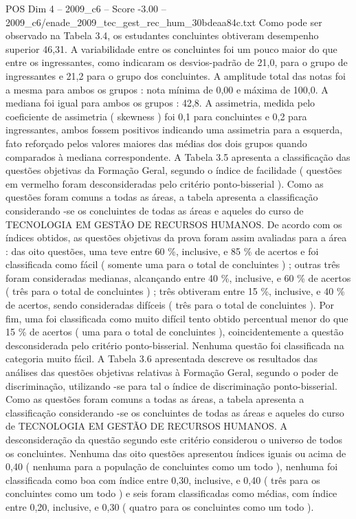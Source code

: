 \begin{textsample}{POS Dim 4 – 2009\_c6 – Score -3.00 – 2009\_c6/enade\_2009\_tec\_gest\_rec\_hum\_30bdeaa84c.txt}
Como pode ser observado na Tabela 3.4, os estudantes concluintes obtiveram desempenho superior 46,31.
A variabilidade entre os concluintes foi um pouco maior do que entre os ingressantes, como indicaram os desvios-padrão de 21,0, para o grupo de ingressantes e 21,2 para o grupo dos concluintes.
A amplitude total das notas foi a mesma para ambos os grupos : nota mínima de 0,00 e máxima de 100,0.
A mediana foi igual para ambos os grupos : 42,8.
A assimetria, medida pelo coeficiente de assimetria ( skewness ) foi 0,1 para concluintes e 0,2 para ingressantes, ambos fossem positivos indicando uma assimetria para a esquerda, fato reforçado pelos valores maiores das médias dos dois grupos quando comparados à mediana correspondente.
A Tabela 3.5 apresenta a classificação das questões objetivas da Formação Geral, segundo o índice de facilidade ( questões em vermelho foram desconsideradas pelo critério ponto-bisserial ).
Como as questões foram comuns a todas as áreas, a tabela apresenta a classificação considerando -se os concluintes de todas as áreas e aqueles do curso de TECNOLOGIA EM GESTÃO DE RECURSOS HUMANOS.
De acordo com os índices obtidos, as questões objetivas da prova foram assim avaliadas para a área : das oito questões, uma teve entre 60 \%, inclusive, e 85 \% de acertos e foi classificada como fácil ( somente uma para o total de concluintes ) ; outras três foram consideradas medianas, alcançando entre 40 \%, inclusive, e 60 \% de acertos ( três para o total de concluintes ) ; três obtiveram entre 15 \%, inclusive, e 40 \% de acertos, sendo consideradas difíceis ( três para o total de concluintes ).
Por fim, uma foi classificada como muito difícil tento obtido percentual menor do que 15 \% de acertos ( uma para o total de concluintes ), coincidentemente a questão desconsiderada pelo critério ponto-bisserial.
Nenhuma questão foi classificada na categoria muito fácil.
A Tabela 3.6 apresentada descreve os resultados das análises das questões objetivas relativas à Formação Geral, segundo o poder de discriminação, utilizando -se para tal o índice de discriminação ponto-bisserial.
Como as questões foram comuns a todas as áreas, a tabela apresenta a classificação considerando -se os concluintes de todas as áreas e aqueles do curso de TECNOLOGIA EM GESTÃO DE RECURSOS HUMANOS.
A desconsideração da questão segundo este critério considerou o universo de todos os concluintes.
Nenhuma das oito questões apresentou índices iguais ou acima de 0,40 ( nenhuma para a população de concluintes como um todo ), nenhuma foi classificada como boa com índice entre 0,30, inclusive, e 0,40 ( três para os concluintes como um todo ) e seis foram classificadas como médias, com índice entre 0,20, inclusive, e 0,30 ( quatro para os concluintes como um todo ).

\end{textsample}
